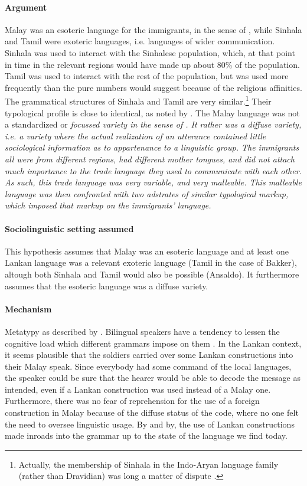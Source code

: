 \paragraph{Argument}
Malay was an esoteric language for the immigrants, in the sense of \citet{Ross}, while Sinhala and Tamil were exoteric languages, i.e. languages of wider communication. Sinhala was used to interact with the Sinhalese population, which, at that point in time in the relevant regions would have made up about 80\% of the population. Tamil was used to interact with the rest of the population, but was used more frequently than the pure numbers would suggest because of the religious affinities. The grammatical structures of Sinhala and Tamil are very similar.\footnote{Actually, the membership of Sinhala in the Indo-Aryan language family (rather than Dravidian) was long a matter of dispute \citep{abc}.} Their typological profile is close to identical, as noted by \citet{SmithRH}. The Malay language was not a standardized or \em  focussed \em variety in the sense of \citet{LePageEtAl1985}. It rather was a \em diffuse \em variety, i.e. a variety where the actual realization of an utterance contained little sociological information as to appartenance to a linguistic group. The immigrants all were from different regions, had different mother tongues, and did not attach much importance to the trade language they used to communicate with each other. As such, this trade language was very variable, and very malleable. This malleable language was then confronted with two adstrates of similar typological markup, which imposed that markup on the immigrants' language.

\paragraph{Sociolinguistic setting assumed}
This hypothesis assumes that Malay was an esoteric language and at least one Lankan language was a relevant exoteric language (Tamil in the case of Bakker), altough both Sinhala and Tamil would also be possible (Ansaldo). It furthermore assumes that the esoteric language was a diffuse variety.

\paragraph{Mechanism}
Metatypy as described by \citet{Ross1996,Ross1997,Ross2007}.  Bilingual speakers have a tendency to lessen the cognitive load which different grammars impose on them \citep{Nadkarni1975, Ross2007}. In the Lankan context, it seems plausible that the soldiers carried over some Lankan constructions into their Malay speak. Since everybody had some command of the local languages, the speaker could be sure that the hearer would be able to decode the message as intended, even if a Lankan construction was used instead of a Malay one. Furthermore, there was no fear of reprehension for the use of a foreign construction in Malay because of the diffuse status of the code, where no one felt the need to oversee linguistic usage. By and by, the use of Lankan constructions made inroads into the grammar up to the state of the language we find today.


